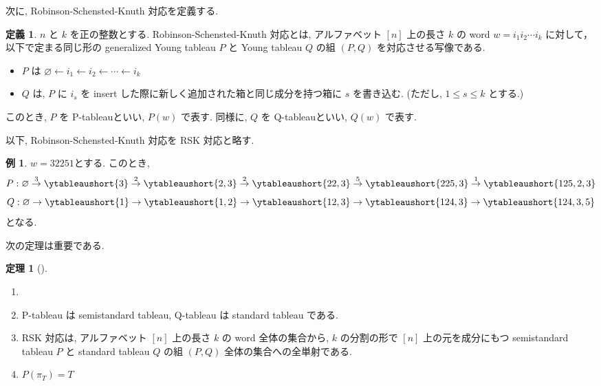 \documentclass[
  a4paper, 
  12pt,
  ja=standard,
  xelatex,
  left=30truemm,
  right=30truemm,
  titlepage 
]{bxjsarticle}
\theoremstyle{definition}
\newtheorem{df}{定義}[section]
\newtheorem{thm}{定理}[section]
\newtheorem*{ex}{例}
\begin{document}
次に, Robinson-Schensted-Knuth 対応を定義する.

\begin{df}
  $n$ と $k$ を正の整数とする.
  Robinson-Schensted-Knuth 対応とは, アルファベット $[n]$ 上の長さ $k$ の word $w = i_1 i_2 \cdots i_k$ に対して，
  以下で定まる同じ形の generalized Young tableau $P$ と Young tableau $Q$ の組 $(P,Q)$ を対応させる写像である.
  \begin{itemize}
    \item $P$ は $ \varnothing \leftarrow i_1 \leftarrow i_2 \leftarrow \cdots \leftarrow i_k $
    \item $Q$ は, $P$ に $i_s$ を insert した際に新しく追加された箱と同じ成分を持つ箱に $s$ を書き込む.
    (ただし, $1 \leq s \leq k$ とする.)
  \end{itemize}
  このとき, $P$ を P-tableauといい, $P(w)$ で表す.
  同様に, $Q$ を Q-tableauといい, $Q(w)$ で表す.
\end{df}

以下, Robinson-Schensted-Knuth 対応を RSK 対応と略す.

\begin{ex}
  $w = 3 2 2 5 1$とする.
  このとき,
  \[
  P: \varnothing \overset{3}{\rightarrow} 
  \ytableaushort{3} \overset{2}{\rightarrow}
  \ytableaushort{2, 3} \overset{2}{\rightarrow}
  \ytableaushort{22, 3} \overset{5}{\rightarrow}
  \ytableaushort{225, 3} \overset{1}{\rightarrow}
  \ytableaushort{125, 2, 3}
  \]
  \[
  Q: \varnothing \rightarrow
  \ytableaushort{1} \rightarrow
  \ytableaushort{1, 2} \rightarrow
  \ytableaushort{12, 3} \rightarrow
  \ytableaushort{124, 3} \rightarrow
  \ytableaushort{124, 3, 5}
  \]
  となる.
\end{ex}

次の定理は重要である.

\begin{thm} [{\cite[定理4.8.2]{b1}}] 
  \begin{enumerate}
    \item[]
    \item P-tableau は semistandard tableau, Q-tableau は standard tableau である.
    \item RSK 対応は, アルファベット $[n]$ 上の長さ $k$ の word 全体の集合から, $k$ の分割の形で
    $[n]$ 上の元を成分にもつ semistandard tableau $P$ と standard tableau $Q$ の組 $(P,Q)$ 全体の集合への全単射である.
    \item $P(\pi_T) = T$
  \end{enumerate}
\end{thm}
\end{document}
